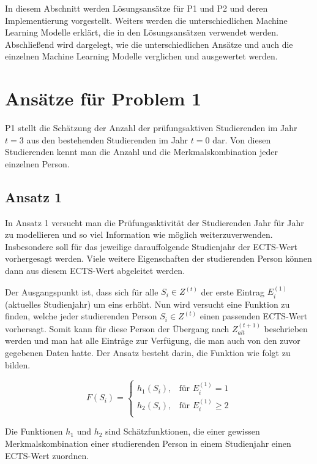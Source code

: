 

In diesem Abschnitt werden L\"osungsans\"atze f\"ur P1 und P2 und deren Implementierung vorgestellt.
Weiters werden die unterschiedlichen Machine Learning Modelle erkl\"art, die in den L\"osungsans\"atzen verwendet werden.
Abschlie{\ss}end wird dargelegt, wie die unterschiedlichen Ans\"atze und auch die einzelnen Machine Learning Modelle
verglichen und ausgewertet werden.


\section{Ans\"atze f\"ur Problem 1}
P1 stellt die Sch\"atzung der Anzahl der pr\"ufungsaktiven Studierenden im Jahr $t = 3$ aus den bestehenden Studierenden im Jahr $t = 0$ dar.
Von diesen Studierenden kennt man die Anzahl und die Merkmalskombination jeder einzelnen Person.

\subsection{Ansatz 1}
\label{sec:appr1}
In Ansatz 1 versucht man die Pr\"ufungsaktivit\"at der Studierenden Jahr f\"ur Jahr zu modellieren und so viel Information wie m\"oglich weiterzuverwenden.
Insbesondere soll f\"ur das jeweilige darauffolgende Studienjahr der ECTS-Wert vorhergesagt werden. Viele weitere Eigenschaften der studierenden Person
k\"onnen dann aus diesem ECTS-Wert abgeleitet werden.

Der Ausgangspunkt ist, dass sich für alle $S_i \in Z^{(t)}$ der erste Eintrag $E_i^{(1)}$ (aktuelles Studienjahr) um eins erhöht.
Nun wird versucht eine Funktion zu finden, welche jeder studierenden Person $S_i \in Z^{(t)}$ einen passenden ECTS-Wert vorhersagt.
Somit kann f\"ur diese Person der \"Ubergang nach $Z_{alt}^{(t+1)}$ beschrieben werden und man hat alle Eintr\"age zur Verf\"ugung, die
man auch von den zuvor gegebenen Daten hatte. Der Ansatz besteht darin, die Funktion wie folgt zu bilden.

$$
  F(S_i)=
  \left\{
  \begin{array}{lr}
    h_1(S_i), & \text{für }E_i^{(1)} = 1    \\
    h_2(S_i), & \text{für }E_i^{(1)} \geq 2 \\
  \end{array}
  \right.
$$

Die Funktionen $h_1$ und $h_2$ sind Sch\"atzfunktionen, die einer gewissen Merkmalskombination einer studierenden Person in einem Studienjahr einen
ECTS-Wert zuordnen.

